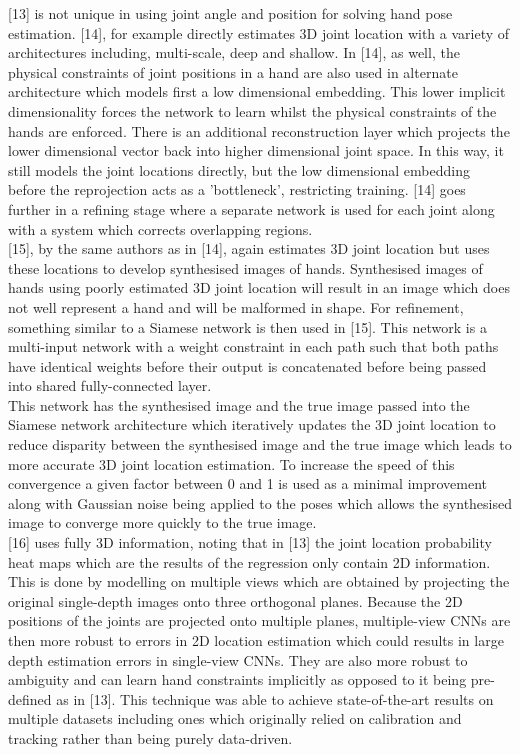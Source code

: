 \documentclass{article}
\begin{document}
[13] is not unique in using joint angle and position for solving hand pose estimation. [14], for example directly estimates 3D joint location with a variety of architectures including, multi-scale, deep and shallow. In [14], as well, the physical constraints of joint positions in a hand are also used in alternate architecture which models first a low dimensional embedding. This lower implicit dimensionality forces the network to learn whilst the physical constraints of the hands are enforced. There is an additional reconstruction layer which projects the lower dimensional vector back into higher dimensional joint space. In this way, it still models the joint locations directly, but the low dimensional embedding before the reprojection acts as a 'bottleneck', restricting training. [14] goes further in a refining stage where a separate network is used for each joint along with a system which corrects overlapping regions.\\

[15], by the same authors as in [14], again estimates 3D joint location but uses these locations to develop synthesised images of hands. Synthesised images of hands using poorly estimated 3D joint location will result in an image which does not well represent a hand and will be malformed in shape. For refinement, something similar to a Siamese network is then used in [15]. This network is a multi-input network with a weight constraint in each path such that both paths have identical weights before their output is concatenated before being passed into shared fully-connected layer.\\

This network has the synthesised image and the true image passed into the Siamese network architecture which iteratively updates the 3D joint location to reduce disparity between the synthesised image and the true image which leads to more accurate 3D joint location estimation. To increase the speed of this convergence a given factor between 0 and 1 is used as a minimal improvement along with Gaussian noise being applied to the poses which allows the synthesised image to converge more quickly to the true image.\\

[16] uses fully 3D information, noting that in [13] the joint location probability heat maps which are the results of the regression only contain 2D information. This is done by modelling on multiple views which are obtained by projecting the original single-depth images onto three orthogonal planes. Because the 2D positions of the joints are projected onto multiple planes, multiple-view CNNs are then more robust to errors in 2D location estimation which could results in large depth estimation errors in single-view CNNs. They are also more robust to ambiguity and can learn hand constraints implicitly as opposed to it being pre-defined as in [13]. This technique was able to achieve state-of-the-art results on multiple datasets including ones which originally relied on calibration and tracking rather than being purely data-driven.\\
\end{document}
